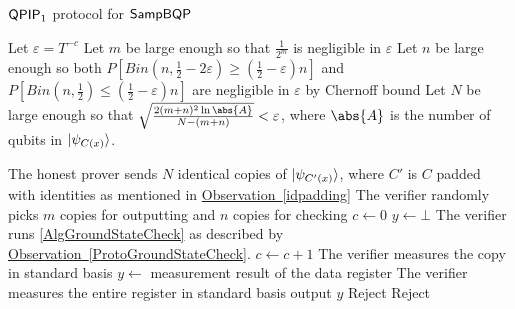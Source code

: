 \begin{algorithm}
	\caption{ $\operatorname{\mathsf{QPIP}}_1$ protocol for $\operatorname{\mathsf{SampBQP}}$}
	\label{ProtoQPIP1}
	\begin{algorithmic}[1]
		\State Let $\varepsilon=T^{-c}$
		\State Let $m$ be large enough so that $\frac{1}{2^m}$ is negligible in $\varepsilon$
		\State Let $n$ be large enough so both $P\left[Bin(n, \frac{1}{2}-2\varepsilon)\geq\left(\frac{1}{2}-\varepsilon\right)n\right]$ and $P\left[Bin(n, \frac{1}{2})\leq\left(\frac{1}{2}-\varepsilon\right)n\right]$ are negligible in $\varepsilon$ by Chernoff bound
		\State Let $N$ be large enough so that $\sqrt{\frac{2(m+n)^2\ln\abs{A}}{N-(m+n)}}<\varepsilon$, where $\abs{A}$ is the number of qubits in $\ket{\psi_{C(x)}}$.

		\State The honest prover sends $N$ identical copies of $\ket{\psi_{C'(x)}}$, where $C'$ is $C$ padded with identities as mentioned in \hyperref[idpadding]{Observation~\ref*{idpadding}}
		\State The verifier randomly picks $m$ copies for outputting and $n$ copies for checking
		\State $c\gets0$
		\State $y\gets\bot$
			\State The verifier runs \autoref{AlgGroundStateCheck} as described by \hyperref[ProtoGroundStateCheck]{Observation~\ref*{ProtoGroundStateCheck}}.
				$c\gets c+1$
			\EndIf
			\State The verifier measures the copy in standard basis
					\State $y\gets$ measurement result of the data register
				\EndIf
			\EndIf
			\Else
			\State The verifier measures the entire register in standard basis
			\EndIf
		\EndFor
		\State output $y$
		\Else
		\State Reject
		\EndIf
		\Else
		\State Reject
		\EndIf
		\EndProcedure
	\end{algorithmic}
\end{algorithm}

